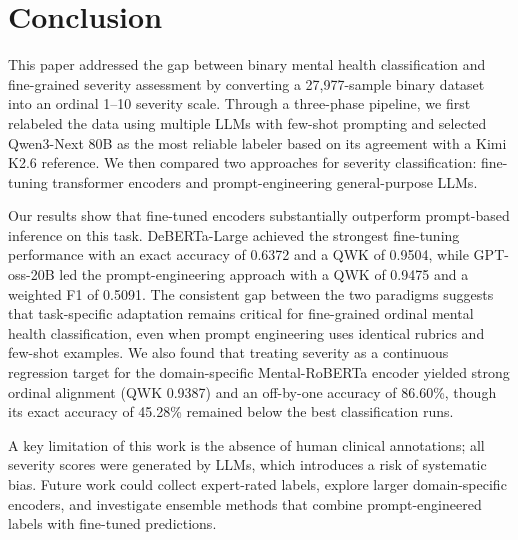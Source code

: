 \documentclass[conference]{IEEEtran}
\begin{document}
\section{Conclusion}

This paper addressed the gap between binary mental health classification and fine-grained severity assessment by converting a 27,977-sample binary dataset into an ordinal 1--10 severity scale. Through a three-phase pipeline, we first relabeled the data using multiple LLMs with few-shot prompting and selected Qwen3-Next 80B as the most reliable labeler based on its agreement with a Kimi K2.6 reference. We then compared two approaches for severity classification: fine-tuning transformer encoders and prompt-engineering general-purpose LLMs.

Our results show that fine-tuned encoders substantially outperform prompt-based inference on this task. DeBERTa-Large achieved the strongest fine-tuning performance with an exact accuracy of 0.6372 and a QWK of 0.9504, while GPT-oss-20B led the prompt-engineering approach with a QWK of 0.9475 and a weighted F1 of 0.5091. The consistent gap between the two paradigms suggests that task-specific adaptation remains critical for fine-grained ordinal mental health classification, even when prompt engineering uses identical rubrics and few-shot examples. We also found that treating severity as a continuous regression target for the domain-specific Mental-RoBERTa encoder yielded strong ordinal alignment (QWK 0.9387) and an off-by-one accuracy of 86.60\%, though its exact accuracy of 45.28\% remained below the best classification runs.

A key limitation of this work is the absence of human clinical annotations; all severity scores were generated by LLMs, which introduces a risk of systematic bias. Future work could collect expert-rated labels, explore larger domain-specific encoders, and investigate ensemble methods that combine prompt-engineered labels with fine-tuned predictions.





  

\end{document}
